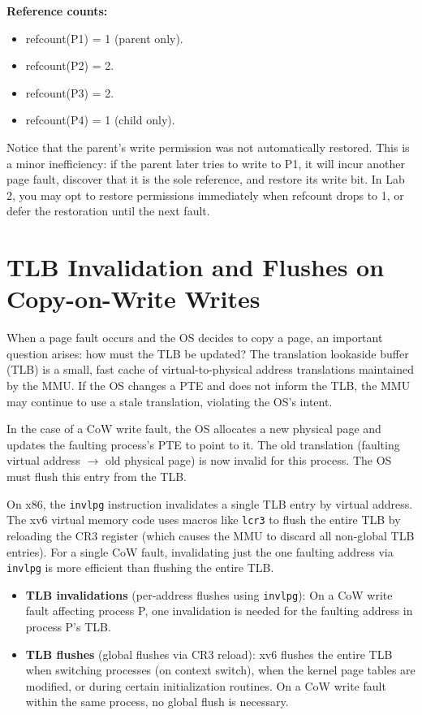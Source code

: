 \documentclass[11pt]{article}
\begin{document}
\textbf{Reference counts:}
\begin{itemize}
    \item refcount(P1) = 1 (parent only).
    \item refcount(P2) = 2.
    \item refcount(P3) = 2.
    \item refcount(P4) = 1 (child only).
\end{itemize}

Notice that the parent's write permission was not automatically restored. This is a minor inefficiency: if the parent later tries to write to P1, it will incur another page fault, discover that it is the sole reference, and restore its write bit. In Lab 2, you may opt to restore permissions immediately when refcount drops to 1, or defer the restoration until the next fault.

\section{TLB Invalidation and Flushes on Copy-on-Write Writes}

When a page fault occurs and the OS decides to copy a page, an important question arises: how must the TLB be updated? The translation lookaside buffer (TLB) is a small, fast cache of virtual-to-physical address translations maintained by the MMU. If the OS changes a PTE and does not inform the TLB, the MMU may continue to use a stale translation, violating the OS's intent.

In the case of a CoW write fault, the OS allocates a new physical page and updates the faulting process's PTE to point to it. The old translation (faulting virtual address $\rightarrow$ old physical page) is now invalid for this process. The OS must flush this entry from the TLB.

On x86, the \texttt{invlpg} instruction invalidates a single TLB entry by virtual address. The xv6 virtual memory code uses macros like \texttt{lcr3} to flush the entire TLB by reloading the CR3 register (which causes the MMU to discard all non-global TLB entries). For a single CoW fault, invalidating just the one faulting address via \texttt{invlpg} is more efficient than flushing the entire TLB.

\begin{itemize}
    \item \textbf{TLB invalidations} (per-address flushes using \texttt{invlpg}): On a CoW write fault affecting process P, one invalidation is needed for the faulting address in process P's TLB.
    \item \textbf{TLB flushes} (global flushes via CR3 reload): xv6 flushes the entire TLB when switching processes (on context switch), when the kernel page tables are modified, or during certain initialization routines. On a CoW write fault within the same process, no global flush is necessary.
\end{itemize}
\end{document}
